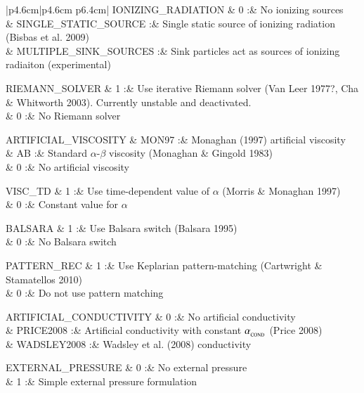 \documentclass[a4paper]{article}
\begin{document}
\begin{center}
\begin{supertabular}{|p{4.6cm}|p{4.6cm} p{6.4cm}|}
 IONIZING\_RADIATION & 0 :& No ionizing sources \\
                     & SINGLE\_STATIC\_SOURCE :& Single static source of ionizing radiation (Bisbas et al. 2009) \\
                     & MULTIPLE\_SINK\_SOURCES :& Sink particles act as sources of ionizing radiaiton (experimental) \\ \hline     

 RIEMANN\_SOLVER & 1   :& Use iterative Riemann solver (Van Leer 1977?, Cha \& Whitworth 2003).  Currently unstable and deactivated.\\
                 & 0   :& No Riemann solver \\ \hline

 ARTIFICIAL\_VISCOSITY  & MON97 :& Monaghan (1997) artificial viscosity \\
               & AB    :& Standard $\alpha$-$\beta$ viscosity (Monaghan \& Gingold 1983)\\
               & 0     :& No artificial viscosity \\ \hline

 VISC\_TD      & 1  :& Use time-dependent value of $\alpha$ (Morris \& Monaghan 1997)\\
               & 0  :& Constant value for $\alpha$ \\ \hline

 BALSARA       & 1  :& Use Balsara switch (Balsara 1995) \\
               & 0  :& No Balsara switch \\ \hline

 PATTERN\_REC  & 1 :& Use Keplarian pattern-matching (Cartwright \& Stamatellos 2010) \\
               & 0 :& Do not use pattern matching \\ \hline

 ARTIFICIAL\_CONDUCTIVITY  & 0         :& No artificial conductivity \\
                           & PRICE2008 :& Artificial conductivity with constant $\alpha_{_{\rm COND}}$ (Price 2008)\\ 
                           & WADSLEY2008 :& Wadsley et al. (2008) conductivity\\ \hline

 EXTERNAL\_PRESSURE & 0 :& No external pressure \\
                    & 1 :& Simple external pressure formulation \\ \hline


\end{supertabular}
\end{center}
\end{document}
